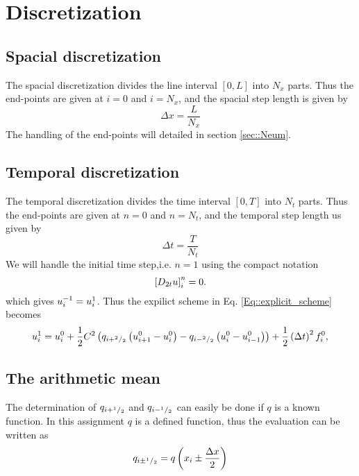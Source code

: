 \documentclass[11pt]{article}
\begin{document}
\section{Discretization}

\subsection{Spacial discretization}
The spacial discretization divides the line interval $\left[0,L \right]$ into $N_x$ parts. Thus the end-points are given at $i=0$ and $i=N_x$, and the spacial step length is given by
\begin{equation}
\Delta x = \frac{L}{N_x}
\end{equation}
The handling of the end-points will detailed in section \ref{sec::Neum}. 
\subsection{Temporal discretization}
The temporal discretization divides the time interval $\left[0,T \right]$ into $N_t$ parts. Thus the end-points are given at $n=0$ and $n=N_t$, and the temporal step length us given by
\begin{equation}
\Delta t = \frac{T}{N_t}
\end{equation}
We will handle the initial time step,i.e. $n=1$ using the compact notation 
\begin{equation}
\left[ D_{2t} u\right]\sp{n}_i = 0 .
\end{equation}
which gives $u\sp{-1}_i = u\sp{1}_i$. 
Thus the expilict scheme in Eq. \ref{Eq::explicit_scheme} becomes 
\begin{equation}
u\sp{1}_i  =  u\sp{0}_i + \frac{1}{2}C\sp{2} \left( q_{i+\sp{2}/_{2}} \left( u\sp{0}_{i+1} -u\sp{0}_{i} \right) -  q_{i-\sp{2}/_{2}}  \left( u\sp{0}_{i} -u\sp{0}_{i-1} \right) \right) + \frac{1}{2}\left(\Delta t\right)\sp{2}f\sp{0}_i ,
\label{Eq::inital_time_step}
\end{equation}


\subsection{The arithmetic mean}
The determination of $q_{i+\sp{1}/_2}$ and $q_{i-\sp{1}/_2}$ can easily be done if $q$ is a known function. In this assignment $q$ is a defined function, thus the evaluation can be written as
\begin{equation}
q_{i\pm \sp{1}/_2} = q\left( x_{i} \pm  \frac{\Delta x}{2}\right)  
\label{Eq::mean}
\end{equation}
\end{document}
